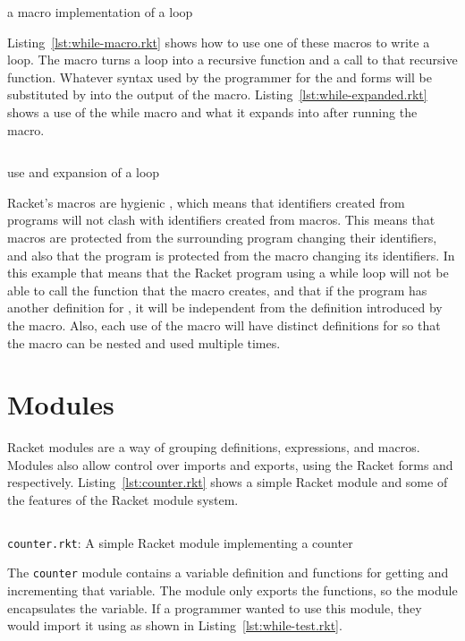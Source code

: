 \begin{listing}[tb]
  \inputminted{racket}{listings/while-macro.rkt}
  \caption{a macro implementation of a  loop}
  \label{lst:while-macro.rkt}
\end{listing}
Listing~\ref{lst:while-macro.rkt} shows how to use one of these macros to write a  loop. 
The macro turns a  loop into a recursive function and a call to that recursive function.
Whatever syntax used by the programmer for the  and  forms will be substituted by  into the output of the macro. 
Listing~\ref{lst:while-expanded.rkt} shows a use of the while macro and what it expands into after running the macro. 
\begin{listing}[tb]
  \inputminted{racket}{listings/while-expanded.rkt}
  \caption{use and expansion of a  loop}
  \label{lst:while-expanded.rkt}
\end{listing}
Racket's macros are hygienic \cite{hygiene}, which means that identifiers created from programs will not clash with identifiers created from macros. 
This means that macros are protected from the surrounding program changing their identifiers, and also that the program is protected from the macro changing its identifiers.
In this example that means that the Racket program using a while loop will not be able to call the  function that the macro creates, and that if the program has another definition for , it will be independent from the definition introduced by the macro.
Also, each use of the macro will have distinct definitions for  so that the macro can be nested and used multiple times.
\section{Modules}
Racket modules are a way of grouping definitions, expressions, and macros. 
Modules also allow control over imports and exports, using the Racket forms  and  respectively.
Listing~\ref{lst:counter.rkt} shows a simple Racket module and some of the features of the Racket module system.
\begin{listing}[tb]
  \inputminted{racket}{listings/counter.rkt}
  \caption{\texttt{counter.rkt}: A simple Racket module implementing a counter}
  \label{lst:counter.rkt}
\end{listing}
The \texttt{counter} module contains a variable definition and functions for getting and incrementing that variable.
The module only exports the functions, so the module encapsulates the variable.
If a programmer wanted to use this module, they would import it using  as shown in Listing~\ref{lst:while-test.rkt}. 

